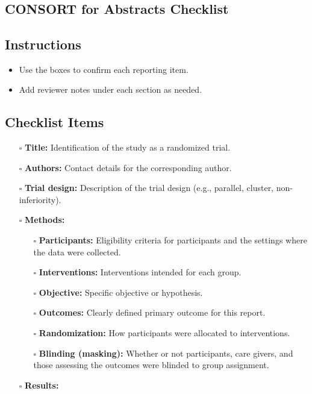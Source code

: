 \documentclass[11pt]{article}
\def\tightlist{}
\begin{document}
\begin{center}
{\LARGE }\\[4pt]
\normalsize 
\end{center}
\vspace{1em}

\begin{Form}

\section{CONSORT for Abstracts
Checklist}\label{consort-for-abstracts-checklist}

\subsection{Instructions}\label{instructions}

\begin{itemize}
\tightlist
\item
  Use the boxes to confirm each reporting item.
\item
  Add reviewer notes under each section as needed.
\end{itemize}

\subsection{Checklist Items}\label{checklist-items}

\begin{itemize}
\tightlist
\item[$\square$]
  \textbf{Title:} Identification of the study as a randomized trial.
\item[$\square$]
  \textbf{Authors:} Contact details for the corresponding author.
\item[$\square$]
  \textbf{Trial design:} Description of the trial design (e.g.,
  parallel, cluster, non-inferiority).
\item[$\square$]
  \textbf{Methods:}

  \begin{itemize}
  \tightlist
  \item[$\square$]
    \textbf{Participants:} Eligibility criteria for participants and the
    settings where the data were collected.
  \item[$\square$]
    \textbf{Interventions:} Interventions intended for each group.
  \item[$\square$]
    \textbf{Objective:} Specific objective or hypothesis.
  \item[$\square$]
    \textbf{Outcomes:} Clearly defined primary outcome for this report.
  \item[$\square$]
    \textbf{Randomization:} How participants were allocated to
    interventions.
  \item[$\square$]
    \textbf{Blinding (masking):} Whether or not participants, care
    givers, and those assessing the outcomes were blinded to group
    assignment.
  \end{itemize}
\item[$\square$]
  \textbf{Results:}


\end{itemize}
\end{Form}
\end{document}
